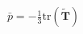 \documentclass[preview]{standalone}
\begin{document}
\begin{align*}
\bar{p} = -\frac{1}{3} \text{tr}(\tilde{\mathbf{T}})
\end{align*}
\end{document}
